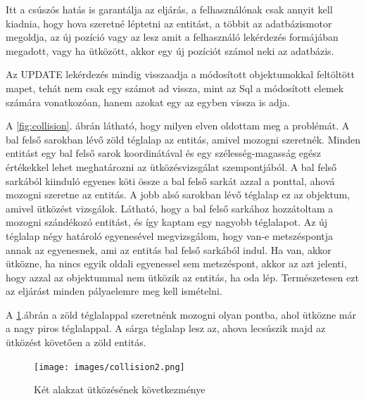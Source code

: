 \begin{sql}
Itt a csúszós hatás is garantálja az eljárás, a felhasználónak csak annyit kell kiadnia, hogy hova szeretné léptetni az entitást, a többit az adatbázismotor megoldja, az új pozíció vagy az lesz amit a felhasználó lekérdezés formájában megadott, vagy ha ütközött, akkor egy új pozíciót számol neki az adatbázis.

Az UPDATE lekérdezés mindig visszaadja a módosított objektumokkal feltöltött mapet, tehát nem csak egy számot ad vissza, mint az Sql a módosított elemek számára vonatkozóan, hanem azokat egy az egyben vissza is adja.



A \ref{fig:collision}. ábrán látható, hogy milyen elven oldottam meg a problémát. A bal fels\H o sarokban lév\H o zöld téglalap az entitás, amivel mozogni szeretnék. Minden entitást egy bal fels\H o sarok koordinátával és egy szélesség-magasság egész értékekkel lehet meghatározni az ütközésvizsgálat szempontjából. A bal fels\H o sarkából kiinduló egyenes köti össze a bal fels\H o sarkát azzal a ponttal, ahová mozogni szeretne az entitás. A jobb alsó sarokban lév\H o téglalap ez az objektum, amivel ütközést vizsgálok. Látható, hogy a bal fels\H o sarkához hozzátoltam a mozogni szándékozó entitást, és így kaptam egy nagyobb téglalapot.
Az új téglalap négy határoló egyenesével megvizsgálom, hogy van-e metszéspontja annak az egyenesnek, ami az entitás bal fels\H o sarkából indul. Ha van, akkor ütközne, ha nincs egyik oldali egyenessel sem metszéspont, akkor az azt jelenti, hogy azzal az objektummal nem ütközik az entitás, ha oda lép. Természetesen ezt az eljárást minden pályaelemre meg kell ismételni.



A \ref{fig:collision2}.ábrán a zöld téglalappal szeretnénk mozogni olyan pontba, ahol ütközne már a nagy piros téglalappal. A sárga téglalap lesz az, ahova lecsúszik majd az ütközést követ\H oen a zöld entitás.

\begin{figure}[htb]
	\begin{center}
		\texttt{[image: images/collision2.png]}
		\caption{Két alakzat ütközésének következménye}
		\label{fig:collision2}
	\end{center}
\end{figure}


\end{sql}
